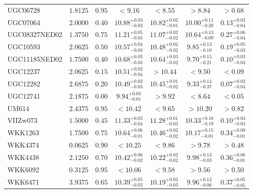 \documentclass[onecolumn]{mn2e}
\begin{document}
{\begin{center}
\begin{longtable}{lcccccc}
UGC06728 & $1.8125$ & $0.95$ & $<9.16$ & $<8.55$ & $>8.84$ &$>0.68$ \\
UGC07064 & $2.0000$ & $0.40$ & $10.88_{-0.03}^{+0.03}$ & $10.82_{-0.01}^{+0.02}$ & $10.00_{-0.20}^{+0.11}$ &$0.13_{-0.04}^{+0.02}$ \\
UGC08327NED02 & $1.3750$ & $0.75$ & $11.21_{-0.03}^{+0.05}$ & $11.07_{-0.02}^{+0.02}$ & $10.64_{-0.09}^{+0.13}$ &$0.27_{-0.04}^{+0.06}$ \\
UGC10593 & $2.0625$ & $0.50$ & $10.57_{-0.03}^{+0.04}$ & $10.48_{-0.02}^{+0.02}$ & $9.85_{-0.10}^{+0.13}$ &$0.19_{-0.03}^{+0.05}$ \\
UGC11185NED02 & $1.7500$ & $0.40$ & $10.68_{-0.03}^{+0.03}$ & $10.64_{-0.02}^{+0.03}$ & $9.70_{-0.21}^{+0.15}$ &$0.10_{-0.04}^{+0.03}$ \\
UGC12237 & $2.0625$ & $0.15$ & $10.51_{-0.04}^{+0.02}$ & $>10.44$ & $<9.50$ &$<0.09$ \\
UGC12282 & $2.6875$ & $0.20$ & $10.49_{-0.03}^{+0.02}$ & $10.45_{-0.02}^{+0.01}$ & $9.33_{-0.37}^{+0.14}$ &$0.07_{-0.04}^{+0.02}$ \\
UGC12741 & $2.1875$ & $0.00$ & $9.94_{-0.01}^{+0.03}$ & $>9.92$ & $<8.64$ &$<0.05$ \\
UM614 & $2.4375$ & $0.95$ & $<10.42$ & $<9.65$ & $>10.20$ &$>0.82$ \\
VIIZw073 & $1.5000$ & $0.45$ & $11.33_{-0.04}^{+0.02}$ & $11.28_{-0.03}^{+0.01}$ & $10.33_{-0.19}^{+0.10}$ &$0.10_{-0.03}^{+0.03}$ \\
WKK1263 & $1.7500$ & $0.75$ & $10.64_{-0.01}^{+0.06}$ & $10.46_{-0.02}^{+0.02}$ & $10.17_{-0.01}^{+0.15}$ &$0.34_{-0.01}^{+0.08}$ \\
WKK4374 & $0.0625$ & $0.90$ & $<10.25$ & $<9.86$ & $>9.78$ &$>0.48$ \\
WKK4438 & $2.1250$ & $0.70$ & $10.42_{-0.02}^{+0.06}$ & $10.22_{-0.02}^{+0.02}$ & $9.98_{-0.03}^{+0.13}$ &$0.36_{-0.01}^{+0.06}$ \\
WKK6092 & $0.3125$ & $0.95$ & $<10.06$ & $<9.58$ & $>9.56$ &$>0.50$ \\
WKK6471 & $3.9375$ & $0.65$ & $10.39_{-0.03}^{+0.05}$ & $10.19_{-0.03}^{+0.02}$ & $9.96_{-0.06}^{+0.12}$ &$0.37_{-0.05}^{+0.05}$ \\
\end{longtable}
\end{center}
}
\end{document}
